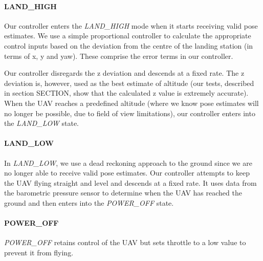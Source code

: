 \documentclass[10pt]{scrartcl} %
\begin{document}
\paragraph{LAND\_HIGH}
Our controller enters the \textit{LAND\_HIGH} mode when it starts receiving valid pose estimates. We use a simple proportional controller to calculate the appropriate control inputs based on the deviation from the centre of the landing station (in terms of x, y and yaw). These comprise the error terms in our controller.

Our controller disregards the z deviation and descends at a fixed rate. The z deviation is, however, used as the best estimate of altitude (our tests, described in section SECTION, show that the calculated z value is extremely accurate). When the UAV reaches a predefined altitude (where we know pose estimates will no longer be possible, due to field of view limitations), our controller enters into the \textit{LAND\_LOW} state.

\paragraph{LAND\_LOW}
In \textit{LAND\_LOW}, we use a dead reckoning approach to the ground since we are no longer able to receive valid pose estimates. Our controller attempts to keep the UAV flying straight and level and descends at a fixed rate. It uses data from the barometric pressure sensor to determine when the UAV has reached the ground and then enters into the \textit{POWER\_OFF} state.

\paragraph{POWER\_OFF}
\textit{POWER\_OFF} retains control of the UAV but sets throttle to a low value to prevent it from flying.
\end{document}
